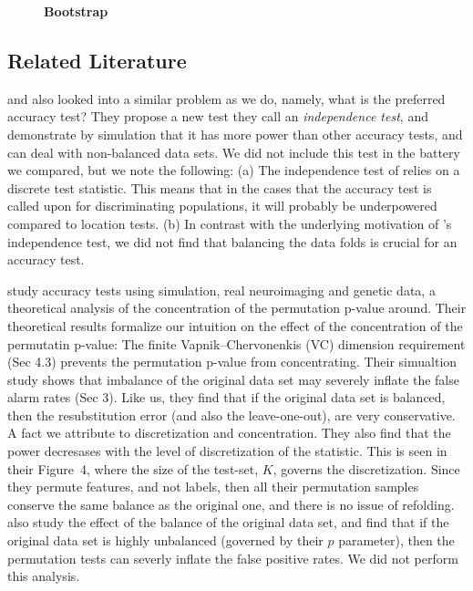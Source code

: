 \documentclass[12pt,a4paper]{article}
\begin{document}
\begin{figure}[ht]
\centering
	  \caption{\textbf{Bootstrap}}
	\label{fig:bootstrap}
\end{figure}



\subsection{Related Literature}
\cite{olivetti_induction_2012} and \cite{olivetti_statistical_2014} also looked into a similar problem as we do, namely, what is the preferred accuracy test?
They propose a new test they call an \emph{independence test}, and demonstrate by simulation that it has more power than other accuracy tests, and can deal with non-balanced data sets. 
We did not include this test in the battery we compared, but we note the following: 
(a) The independence test of \cite{olivetti_induction_2012} relies on a discrete test statistic. This means that in the cases that the accuracy test is called upon for discriminating populations, it will probably be underpowered compared to location tests. 
(b) In contrast with the underlying motivation of \cite{olivetti_induction_2012}'s independence test, we did not find that balancing the data folds is crucial for an accuracy test. 

\cite{golland_permutation_2005} study accuracy tests using simulation, real neuroimaging and genetic data, a theoretical analysis of the concentration of the permutation p-value around.
Their theoretical results formalize our intuition on the effect of the concentration of the permutatin p-value: 
The finite Vapnik–Chervonenkis (VC) dimension requirement (Sec 4.3) prevents the permutation p-value from concentrating. 
Their simualtion study shows that imbalance of the original data set may severely inflate the false alarm rates (Sec 3). 
Like us, they find that if the original data set is balanced, then the resubstitution error (and also the leave-one-out), are very conservative. A fact we attribute to discretization and concentration. 
They also find that the power decresases with the level of discretization of the statistic. 
This is seen in their Figure~4, where the size of the test-set, $K$, governs the discretization. 
Since they permute features, and not labels, then all their permutation samples conserve the same balance as the original one, and there is no issue of refolding. 
\cite{golland_permutation_2005} also study the effect of the balance of the original data set, and find that if the original data set is highly unbalanced (governed by their $p$ parameter), then the permutation tests can severly inflate the false positive rates. We did not perform this analysis. 
\end{document}
